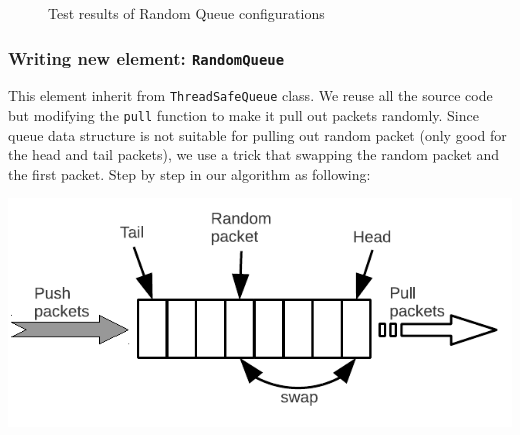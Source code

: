 \documentclass[a4paper]{article}
\begin{document}
    \begin{figure}
      \centering
      \caption{Test results of Random Queue configurations}
      \label{fig:test-clickrandomqueue}
  \end{figure}
  
  \subsubsection{Writing new element: \texttt{RandomQueue}}
  This element inherit from \texttt{ThreadSafeQueue} class. We reuse all the source code but modifying the \texttt{pull} function to make it pull out packets randomly. Since queue data structure is not suitable for pulling out random packet (only good for the head and tail packets), we use a trick that swapping the random packet and the first packet. Step by step in our algorithm as following:
  \begin{center}
	\includegraphics[scale=0.80]{randomqueue-alg.pdf}
	\label{fig:randomqueue}
  \end{center}
\end{document}
